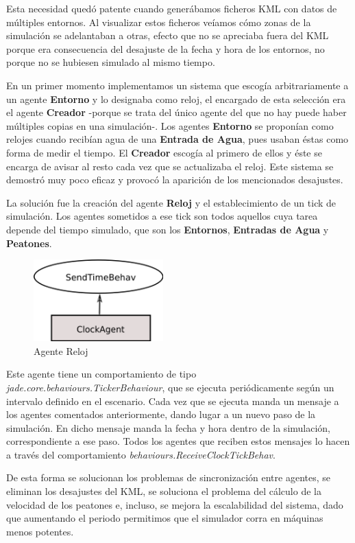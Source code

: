 Esta necesidad quedó patente cuando generábamos ficheros KML con datos de
múltiples entornos. Al visualizar estos ficheros veíamos cómo zonas de la
simulación se adelantaban a otras, efecto que no se apreciaba fuera del KML
porque era consecuencia del desajuste de la fecha y hora de los entornos, no
porque no se hubiesen simulado al mismo tiempo.

En un primer momento implementamos un sistema que escogía arbitrariamente a un
agente {\bf Entorno} y lo designaba como reloj, el encargado de esta selección
era el agente {\bf Creador} -porque se trata del único agente del que no hay
puede haber múltiples copias en una simulación-. Los agentes {\bf Entorno} se
proponían como relojes cuando recibían agua de una {\bf Entrada de Agua}, pues
usaban éstas como forma de medir el tiempo. El {\bf Creador} escogía al primero
de ellos y éste se encarga de avisar al resto cada vez que se actualizaba el
reloj. Este sistema se demostró muy poco eficaz y provocó la aparición de los
mencionados desajustes.

La solución fue la creación del agente {\bf Reloj} y el establecimiento de un
tick de simulación. Los agentes sometidos a ese tick son todos aquellos cuya
tarea depende del tiempo simulado, que son los {\bf Entornos}, {\bf Entradas
de Agua} y {\bf Peatones}.

\begin{figure}[H]
 \centering
 \includegraphics[width=50mm]{figuras/cap5/ag_clock.png}
 \caption{Agente Reloj}
\end{figure}

Este agente tiene un comportamiento de tipo {\em
jade.core.behaviours.TickerBehaviour}, que se ejecuta periódicamente según un
intervalo definido en el escenario. Cada vez que se ejecuta manda un mensaje a
los agentes comentados anteriormente, dando lugar a un nuevo paso de la
simulación. En dicho mensaje manda la fecha y hora dentro de la simulación,
correspondiente a ese paso. Todos los agentes que reciben estos mensajes lo
hacen a través del comportamiento {\em behaviours.ReceiveClockTickBehav}.

De esta forma se solucionan los problemas de sincronización entre agentes, se
eliminan los desajustes del KML, se soluciona el problema del cálculo de la
velocidad de los peatones e, incluso, se mejora la escalabilidad del sistema,
dado que aumentando el periodo permitimos que el simulador corra en máquinas
menos potentes.

